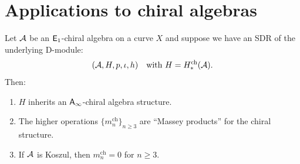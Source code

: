 \section{Applications to chiral algebras}
\label{sec:htt-chiral}


\begin{theorem}
\label{thm:chiral-htt}
Let $\mathcal{A}$ be an $\mathsf{E}_1$-chiral algebra on a curve $X$ and suppose we have an 
SDR of the underlying D-module:
\[
(\mathcal{A}, H, p, \iota, h) \quad \text{with } H = H^{\mathrm{ch}}_*(\mathcal{A}).
\]
Then:
\begin{enumerate}[label=(\roman*)]
\item $H$ inherits an $\mathsf{A}_{\infty}$-chiral algebra structure.
\item The higher operations $\{m_n^{\mathrm{ch}}\}_{n \geq 3}$ are ``Massey products'' 
for the chiral structure.
\item If $\mathcal{A}$ is Koszul, then $m_n^{\mathrm{ch}} = 0$ for $n \geq 3$.
\end{enumerate}
\end{theorem}

